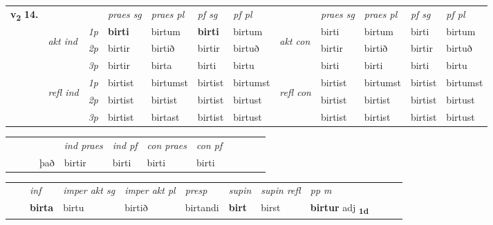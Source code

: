 \begin{tabular}{llllllllllll} \toprule
\multirow{4}{*}{{{\textbf{v{\textsubscript{2}}} \Large{\textbf{14.}}}}}  & &   &  \textit{praes sg}  & \textit{praes pl}  &\textit{ pf sg} & \textit{pf pl} &  &  \textit{praes sg}  & \textit{praes pl}  & \textit{pf sg} & \textit{pf pl } \\*
	\cmidrule{4-7} \cmidrule{9-12}
 & \multirow{3}{*}{\begin{turn}{90}\textit{akt ind}\end{turn}} & {\textit{1p}} & \textbf{birti} & birtum    & \textbf{birti} & birtum & \multirow{3}{*}{\begin{turn}{90}\textit{akt con}\end{turn}} &birti & birtum & birti & birtum\\*
& &  {\textit{2p}} &  birtir  & birtið   & birtir & birtuð & & birtir & birtið & birtir & birtuð \\*
& &  {\textit{3p}} & birtir & birta   & birti & birtu & & birti & birti& birti & birtu  \\*
\cmidrule{4-7} \cmidrule{9-12}
 &\multirow{3}{*}{\begin{turn}{90}\textit{refl ind}\end{turn}} & {\textit{1p}} & birtist & birtumst    & birtist & birtumst & \multirow{3}{*}{\begin{turn}{90}\textit{refl con}\end{turn}}  &birtist & birtumst & birtist & birtumst\\*
 &&  {\textit{2p}} &  birtist  & birtist   & birtist & birtust & &birtist & birtist & birtist & birtust \\*
& &  {\textit{3p}} & birtist & birtast   & birtist & birtust & & birtist & birtist& birtist & birtust  \\*
\cmidrule{4-7} \cmidrule{9-12}
\end{tabular}


\begin{tabular}{llllllllllll}
 & &  & &  \textit{ind praes} & \textit{ind pf} & \textit{con praes} & \textit{con pf} \\*
&  & & það & birtir & birti & birti & birti \\*
\cmidrule{5-9}
\end{tabular}


\begin{tabular}{llllllllllll}
 & & \textit{inf} & \textit{imper akt sg} & \textit{imper akt pl}   & \textit{presp} & \textit{supin} & \textit{supin refl} & \textit{pp m}     \\*
  & & \textbf{birta} & birtu  & birtið   & birtandi &  \textbf{birt} & birst & \textbf{birtur} adj \textbf{\textsubscript{1d}} \\*
\cmidrule{1-12}
\end{tabular}



